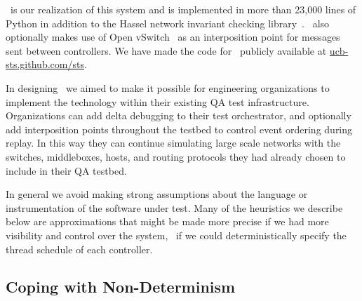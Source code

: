 
\projectname~is our realization of this system and is implemented in more than 23,000 lines of Python in
addition to the Hassel network invariant checking library~\cite{hsa}.
\projectname~also optionally makes use of Open vSwitch~\cite{pfaff2009extending} as an interposition point for
messages sent between controllers. We have
made the code for \projectname~publicly available at \href{http://ucb-sts.github.com/sts}{ucb-sts.github.com/sts}.

 In designing \projectname~we aimed to make
it possible for engineering organizations to
implement the technology within their existing QA test infrastructure.
Organizations can add delta debugging to their test
orchestrator, and optionally add interposition points throughout the
testbed to control event ordering during replay.
In this way they can continue simulating large scale networks with
the switches, middleboxes, hosts, and routing protocols they had already
chosen to include in their QA testbed.

In general we avoid making strong assumptions about the language or instrumentation of the
software under test. Many of the heuristics we describe below are
approximations that might be made more precise if we had more visibility and
control over the system, \eg~if we could deterministically specify the thread schedule of each
controller.


\subsection{Coping with Non-Determinism}
\label{subsec:coping}

